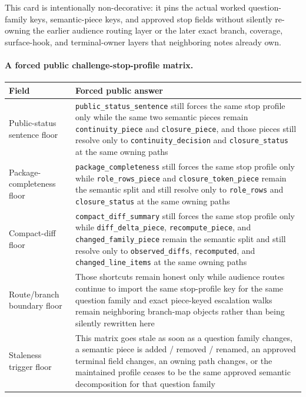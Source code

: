 \documentclass[11pt]{article}
\begin{document}
This card is intentionally non-decorative: it pins the actual worked question-family keys, semantic-piece keys, and approved stop fields without silently re-owning the earlier audience routing layer or the later exact branch, coverage, surface-hook, and terminal-owner layers that neighboring notes already own.\cite{series:workedexample}

\paragraph{A forced public challenge-stop-profile matrix.}
\begin{table}[t]
\centering
\small
\begin{tabularx}{\linewidth}{@{}lX@{}}
\toprule
Field & Forced public answer \\
\midrule
Public-status sentence floor & \nolinkurl{public_status_sentence} still forces the same stop profile only while the same two semantic pieces remain \nolinkurl{continuity_piece} and \nolinkurl{closure_piece}, and those pieces still resolve only to \nolinkurl{continuity_decision} and \nolinkurl{closure_status} at the same owning paths \\
Package-completeness floor & \nolinkurl{package_completeness} still forces the same stop profile only while \nolinkurl{role_rows_piece} and \nolinkurl{closure_token_piece} remain the semantic split and still resolve only to \nolinkurl{role_rows} and \nolinkurl{closure_status} at the same owning paths \\
Compact-diff floor & \nolinkurl{compact_diff_summary} still forces the same stop profile only while \nolinkurl{diff_delta_piece}, \nolinkurl{recompute_piece}, and \nolinkurl{changed_family_piece} remain the semantic split and still resolve only to \nolinkurl{observed_diffs}, \nolinkurl{recomputed}, and \nolinkurl{changed_line_items} at the same owning paths \\
Route/branch boundary floor & Those shortcuts remain honest only while audience routes continue to import the same stop-profile key for the same question family and exact piece-keyed escalation walks remain neighboring branch-map objects rather than being silently rewritten here \\
Staleness trigger floor & This matrix goes stale as soon as a question family changes, a semantic piece is added / removed / renamed, an approved terminal field changes, an owning path changes, or the maintained profile ceases to be the same approved semantic decomposition for that question family \\

\end{tabularx}
\end{table}
\end{document}

